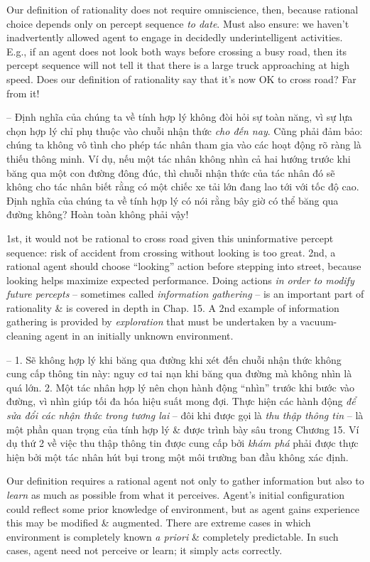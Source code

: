 \documentclass{article}
\begin{document}
\begin{itemize}
\begin{itemize}
\begin{itemize}
\begin{itemize}
				Our definition of rationality does not require omniscience, then, because rational choice depends only on percept sequence {\it to date}. Must also ensure: we haven't inadvertently allowed agent to engage in decidedly underintelligent activities. E.g., if an agent does not look both ways before crossing a busy road, then its percept sequence will not tell it that there is a large truck approaching at high speed. Does our definition of rationality say that it's now OK to cross road? Far from it!
				
				-- Định nghĩa của chúng ta về tính hợp lý không đòi hỏi sự toàn năng, vì sự lựa chọn hợp lý chỉ phụ thuộc vào chuỗi nhận thức {\it cho đến nay}. Cũng phải đảm bảo: chúng ta không vô tình cho phép tác nhân tham gia vào các hoạt động rõ ràng là thiếu thông minh. Ví dụ, nếu một tác nhân không nhìn cả hai hướng trước khi băng qua một con đường đông đúc, thì chuỗi nhận thức của tác nhân đó sẽ không cho tác nhân biết rằng có một chiếc xe tải lớn đang lao tới với tốc độ cao. Định nghĩa của chúng ta về tính hợp lý có nói rằng bây giờ có thể băng qua đường không? Hoàn toàn không phải vậy!
				
				1st, it would not be rational to cross road given this uninformative percept sequence: risk of accident from crossing without looking is too great. 2nd, a rational agent should choose ``looking'' action before stepping into street, because looking helps maximize expected performance. Doing actions {\it in order to modify future percepts} -- sometimes called {\it information gathering} -- is an important part of rationality \& is covered in depth in Chap. 15. A 2nd example of information gathering is provided by {\it exploration} that must be undertaken by a vacuum-cleaning agent in an initially unknown environment.
				
				-- 1. Sẽ không hợp lý khi băng qua đường khi xét đến chuỗi nhận thức không cung cấp thông tin này: nguy cơ tai nạn khi băng qua đường mà không nhìn là quá lớn. 2. Một tác nhân hợp lý nên chọn hành động ``nhìn'' trước khi bước vào đường, vì nhìn giúp tối đa hóa hiệu suất mong đợi. Thực hiện các hành động {\it để sửa đổi các nhận thức trong tương lai} -- đôi khi được gọi là {\it thu thập thông tin} -- là một phần quan trọng của tính hợp lý \& được trình bày sâu trong Chương 15. Ví dụ thứ 2 về việc thu thập thông tin được cung cấp bởi {\it khám phá} phải được thực hiện bởi một tác nhân hút bụi trong một môi trường ban đầu không xác định.
				
				Our definition requires a rational agent not only to gather information but also to {\it learn} as much as possible from what it perceives. Agent's initial configuration could reflect some prior knowledge of environment, but as agent gains experience this may be modified \& augmented. There are extreme cases in which environment is completely known {\it a priori} \& completely predictable. In such cases, agent need not perceive or learn; it simply acts correctly.
				

\end{itemize}
\end{itemize}
\end{itemize}
\end{itemize}
\end{document}
